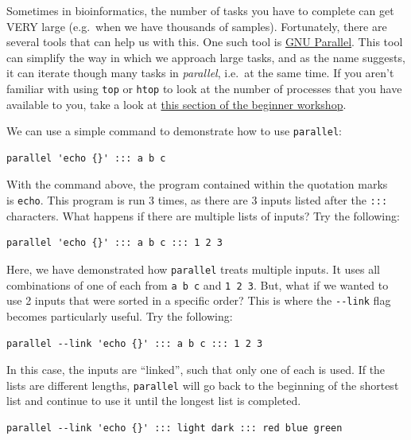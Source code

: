 \documentclass[
]{book}
\begin{document}
Sometimes in bioinformatics, the number of tasks you have to complete can get VERY large (e.g.~when we have thousands of samples). Fortunately, there are several tools that can help us with this. One such tool is \href{https://www.gnu.org/software/parallel/parallel_tutorial.html}{GNU Parallel}. This tool can simplify the way in which we approach large tasks, and as the name suggests, it can iterate though many tasks in \emph{parallel}, i.e.~at the same time. If you aren't familiar with using \texttt{top} or \texttt{htop} to look at the number of processes that you have available to you, take a look at \href{https://bioinformaticsdotca.github.io/BMB_2025/module-1.html\#htop---looking-at-the-number-of-processes-we-have-available-or-running}{this section of the beginner workshop}.

We can use a simple command to demonstrate how to use \texttt{parallel}:

\begin{verbatim}
parallel 'echo {}' ::: a b c
\end{verbatim}

With the command above, the program contained within the quotation marks \texttt{\textquotesingle{}\ \textquotesingle{}} is \texttt{echo}. This program is run 3 times, as there are 3 inputs listed after the \texttt{:::} characters. What happens if there are multiple lists of inputs? Try the following:

\begin{verbatim}
parallel 'echo {}' ::: a b c ::: 1 2 3
\end{verbatim}

Here, we have demonstrated how \texttt{parallel} treats multiple inputs. It uses all combinations of one of each from \texttt{a\ b\ c} and \texttt{1\ 2\ 3}. But, what if we wanted to use 2 inputs that were sorted in a specific order? This is where the \texttt{-\/-link} flag becomes particularly useful. Try the following:

\begin{verbatim}
parallel --link 'echo {}' ::: a b c ::: 1 2 3
\end{verbatim}

In this case, the inputs are ``linked'', such that only one of each is used. If the lists are different lengths, \texttt{parallel} will go back to the beginning of the shortest list and continue to use it until the longest list is completed.

\begin{verbatim}
parallel --link 'echo {}' ::: light dark ::: red blue green
\end{verbatim}
\end{document}
